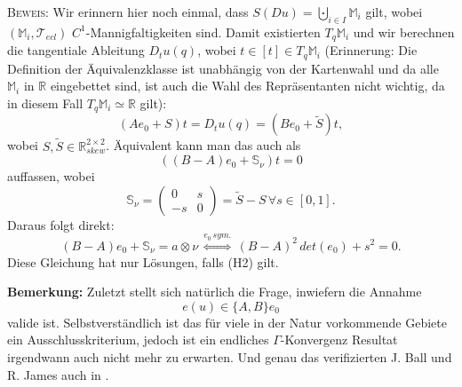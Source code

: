\textsc{Beweis:} Wir erinnern hier noch einmal, dass \(S(Du) = \bigcupdot_{i \in I} \mathbb{M}_i\) gilt, wobei \((\mathbb{M}_i, \mathcal{T}_{ecl})\) \(C^1\)-Mannigfaltigkeiten sind. Damit existierten \(T_q\mathbb{M}_i\) und wir berechnen die tangentiale Ableitung \(D_t u(q)\), wobei \(t \in [t] \in T_q \mathbb{M}_i\) (Erinnerung: Die Definition der Äquivalenzklasse ist unabhängig von der Kartenwahl und da alle \(\mathbb{M}_i\) in \(\mathbb{R}\) eingebettet sind, ist auch die Wahl des Repräsentanten nicht wichtig, da in diesem Fall \(T_q \mathbb{M}_i \simeq \mathbb{R}\) gilt):
\begin{equation}
    (A e_0 + S)t = D_t u(q) = (B e_0 + \tilde{S})t,
\end{equation}
wobei \(S, \tilde{S} \in \mathbb{R}^{2 \times 2}_{skew}\). Äquivalent kann man das auch als
\begin{equation}
    ((B-A)e_0 + \mathbb{S}_{\nu})t = 0
\end{equation}
auffassen, wobei 
\begin{equation}
    \mathbb{S}_{\nu} = \begin{pmatrix}
0 & s\\
-s & 0
\end{pmatrix}
= \tilde{S} - S \, \forall s \in [0,1].
\end{equation} 
Daraus folgt direkt:
\begin{equation}
    (B-A)e_0 + \mathbb{S}_{\nu} = a \otimes \nu \, \stackrel{e_0 \, sym.}{\Leftrightarrow} \, (B-A)^2 \, det(e_0) + s^2 = 0.
\end{equation}
Diese Gleichung hat nur Lösungen, falls (H2) gilt. \QEDB

\textbf{Bemerkung:} Zuletzt stellt sich natürlich die Frage, inwiefern die Annahme
\begin{equation}
    e(u) \in \{A,B\}e_0
\end{equation}
valide ist. Selbstverständlich ist das für viele in der Natur vorkommende Gebiete ein Ausschlusskriterium, jedoch ist ein endliches \(\Gamma\)-Konvergenz Resultat irgendwann auch nicht mehr zu erwarten. Und genau das verifizierten J. Ball und R. James auch in \cite{ball1987fine}.\\

